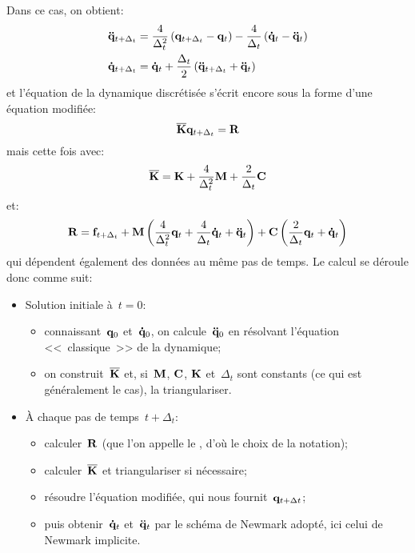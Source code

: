 Dans ce cas, on obtient:
\begin{equation}\colorgreen
\begin{aligned}
&\VV{\ddot q}_{t+\Delta_t} = \frac4{\Delta_t^2} \left( \VV{q}_{t+\Delta_t} -\VV{q}_t\right)
-\frac4{\Delta_t}\left( \VV{\dot q}_t - \VV{\ddot q}_t\right)\\
&\VV{\dot q}_{t+\Delta_t} = \VV{\dot q}_t + \frac{\Delta_t}2\left( \VV{\ddot q}_{t+\Delta_t} + \VV{\ddot q}_t\right)
\end{aligned}
\end{equation}
et l'équation de la dynamique discrétisée s'écrit encore sous la forme d'une équation modifiée:
\begin{equation}\colorblue
\MM{\overline{K}} \VV{q}_{t+\Delta_t} = \VV{R}
\end{equation}
mais cette fois avec:
\begin{equation}\colorgreen
\MM{\overline{K}} = \MM{K}+\frac4{\Delta_t^2}\MM{M}+\frac2{\Delta_t}\MM{C}
\end{equation}
et:
\begin{equation}\colorgreen
\VV{R} = \VV{f}_{t+\Delta_t} + \MM{M}\left(\frac4{\Delta_t^2}\VV{q}_t + \frac4{\Delta_t}\VV{\dot q}_t
+ \VV{\ddot q}_t\right)
+\MM{C}\left( \frac2{\Delta_t}\VV{q}_t + \VV{\dot q}_t\right)
\end{equation}
qui dépendent également des données au même pas de temps.
\medskip
Le calcul se déroule donc comme suit:
\begin{itemize}
  \item Solution initiale à~$t=0$:
	\begin{itemize}
	\item connaissant~$\VV{q}_0$ et~$\VV{\dot q}_0$, on calcule~$\VV{\ddot q}_0$ en résolvant
	l'équation <<~classique~>> de la dynamique;
	\item on construit~$\MM{\overline{K}}$ et, si~$\MM{M}$, $\MM{C}$, $\MM{K}$ et~$\Delta_t$ sont constants
	(ce qui est généralement le cas), la triangulariser.
	\end{itemize}
  \item À chaque pas de temps~$t+\Delta_t$:
	\begin{itemize}
	\item calculer~$\VV{R}$ (que l'on appelle le , d'où le choix de la notation);
	\item calculer~$\MM{\overline{K}}$ et triangulariser si nécessaire;
	\item résoudre l'équation modifiée, qui nous fournit~$\VV{q}_{t+\Delta t}$;
	\item puis obtenir~$\VV{\dot q}_t$ et~$\VV{\ddot q}_t$ par le schéma de Newmark adopté,
	ici celui de Newmark implicite.
	\end{itemize}
\end{itemize}
